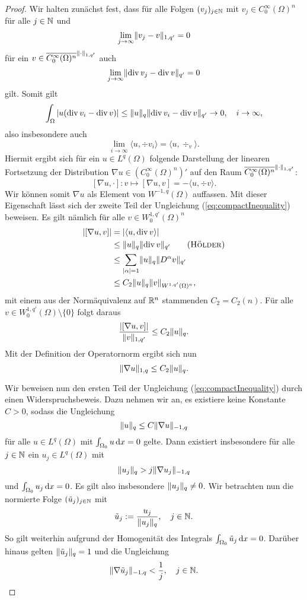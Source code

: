 \begin{proof}
  Wir halten zunächst fest, dass für alle Folgen $(v_j)_{j \in \mathbb{N}}$ mit $v_j \in C_0^\infty(\Omega)^n$ für alle $j \in \mathbb{N}$ und 
  $$
  \lim_{j \to \infty} \lVert v_j - v \rVert_{1,q'} = 0
  $$ 
  für ein $v \in \overline{C_0^\infty(\Omega)^n}^{\lVert \cdot \rVert_{1,q'}}$ auch 
  $$
  \lim_{j \to \infty} \lVert \mathrm{div\,} v_j - \mathrm{div\,} v \rVert_{q'} = 0
  $$ 
  gilt.
  Somit gilt 
  $$
  \int_\Omega | u ( \mathrm{div\,} v_i - \mathrm{div\,} v) | \leq \lVert u \rVert_q \lVert \mathrm{div\,} v_i - \mathrm{div\,} v \rVert_{q'} \to 0, \quad i \to \infty,
  $$
  also insbesondere auch
  $$
  \lim_{i \to \infty} \langle u, \div v_i \rangle = \langle u, \div_v \rangle.
  $$
  Hiermit ergibt sich für ein $u \in L^q(\Omega)$ folgende Darstellung der linearen Fortsetzung der Distribution $\nabla u \in (C_0^\infty(\Omega)^n)'$ auf den Raum $\overline{C_0^\infty(\Omega)^n}^{\lVert \cdot \rVert_{1,q'}}$:
  $$
    [\nabla u, \cdot] \colon v \mapsto [\nabla u, v] 
    = - \langle u, \div v \rangle.
  $$
  Wir können somit $\nabla u$ als Element von $W^{-1,q}(\Omega)$ auffassen.
  Mit dieser Eigenschaft lässt sich der zweite Teil der Ungleichung (\ref{eq:compactInequality}) beweisen. 
  Es gilt nämlich für alle $v \in W_0^{1,q'}(\Omega)^n$
  \begin{align*}
    |[\nabla u, v]|
    &= | \langle u, \div v \rangle| \\
    &\leq \norm{u}_q \norm{\div v}_{q'} \tag{\hoelder}\\
    &\leq \sum_{|\alpha| = 1} \norm{u}_q \norm{D^\alpha v}_{q'} \\
    &\leq C_2 \norm{u}_q \norm{v}_{W^{1,q'}(\Omega)^n},
  \end{align*}
  mit einem aus der Normäquivalenz auf $\mathbb{R}^n$ stammenden $C_2 = C_2(n)$.
  Für alle $v \in W_0^{1,q'}(\Omega) \setminus\{0\}$ folgt daraus
  $$
  \frac{|[\nabla u, v]|}{\lVert v \rVert_{1,q'}} \leq C_2 \lVert u \rVert_q.
  $$
  Mit der Definition der Operatornorm ergibt sich nun
  $$
  \lVert \nabla u \rVert_{1,q} \leq C_2\lVert u \rVert_q.
  $$

  Wir beweisen nun den ersten Teil der Ungleichung (\ref{eq:compactInequality}) durch einen Widerspruchsbeweis.
  Dazu nehmen wir an, es existiere keine Konstante $C > 0$, sodass die Ungleichung
  $$
  \lVert u \rVert_q \leq C \lVert \nabla u \rVert_{-1,q}
  $$
  für alle $u \in L^q(\Omega)$ mit $\int_{\Omega_0} u \, {\operatorname{d}\!{x}} = 0$ gelte.
  Dann existiert insbesondere für alle $j \in \mathbb{N}$ ein $u_j \in L^q(\Omega)$ mit
  $$
  \lVert u_j \rVert_q > j \lVert \nabla u_j \rVert_{-1,q}
  $$
  und $\int_{\Omega_0} u_j \, {\operatorname{d}\!{x}} = 0$.
  Es gilt also insbesondere $\lVert u_j \rVert_q \neq 0$.
  Wir betrachten nun die normierte Folge $(\tilde u_j)_{j \in \mathbb{N}}$ mit 
  $$
  \tilde u_j := \frac{u_j}{\lVert u_j \rVert_{q}}, \quad j \in \mathbb{N}.
  $$
  So gilt weiterhin aufgrund der Homogenität des Integrals $\int_{\Omega_0} \tilde u_j \, {\operatorname{d}\!{x}} = 0$. 
  Darüber hinaus gelten $\lVert \tilde u_j \rVert_q = 1$ und die Ungleichung 
  \begin{equation}
    \label{eq:normLeq1byJ}
    \lVert \nabla \tilde u_j \rVert_{-1,q} < \frac{1}{j}, \quad j \in \mathbb{N}.
  \end{equation}


\end{proof}
